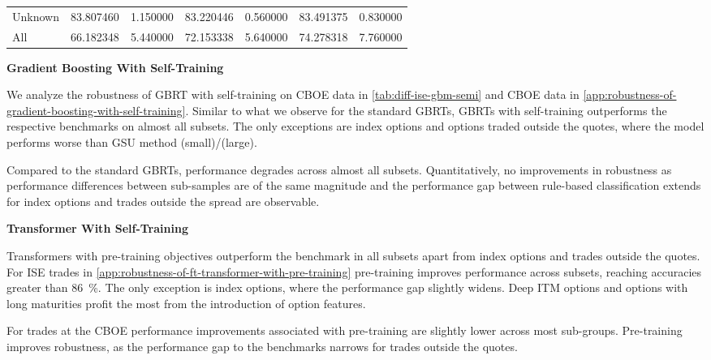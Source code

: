 \begin{table}[h!]
\begin{tabular}{lSSSSSS@{}}
        \tabindent Unknown          & 83.807460                                        & 1.150000                                              & 83.220446                                     & 0.560000 & 83.491375    & 0.830000  \\
        \cmidrule(rl){1-7}
 All              & 66.182348                                        & 5.440000                                              & 72.153338                                     & 5.640000 & 74.278318    & 7.760000  \\
        \bottomrule
    \end{tabular}
\end{table}

\clearpage

\textbf{Gradient Boosting With Self-Training}

We analyze the robustness of \gls{GBRT} with self-training on \gls{CBOE} data in \cref{tab:diff-ise-gbm-semi} and \gls{CBOE} data in \cref{app:robustness-of-gradient-boosting-with-self-training}. Similar to what we observe for the standard \glspl{GBRT}, \glspl{GBRT} with self-training outperforms the respective benchmarks on almost all subsets. The only exceptions are index options and options traded outside the quotes, where the model performs worse than \gls{GSU} method (small)/(large).

Compared to the standard \glspl{GBRT}, performance degrades across almost all subsets. Quantitatively, no improvements in robustness as performance differences between sub-samples are of the same magnitude and the performance gap between rule-based classification extends for index options and trades outside the spread are observable.

\textbf{Transformer With Self-Training}

Transformers with pre-training objectives outperform the benchmark in all subsets apart from index options and trades outside the quotes. For \gls{ISE} trades in \cref{app:robustness-of-ft-transformer-with-pre-training} pre-training improves performance across subsets, reaching accuracies greater than \SI{86}{\percent}. The only exception is index options, where the performance gap slightly widens. Deep \gls{ITM} options and options with long maturities profit the most from the introduction of option features. 

For trades at the \gls{CBOE} performance improvements associated with pre-training are slightly lower across most sub-groups. Pre-training improves robustness, as the performance gap to the benchmarks narrows for trades outside the quotes.

